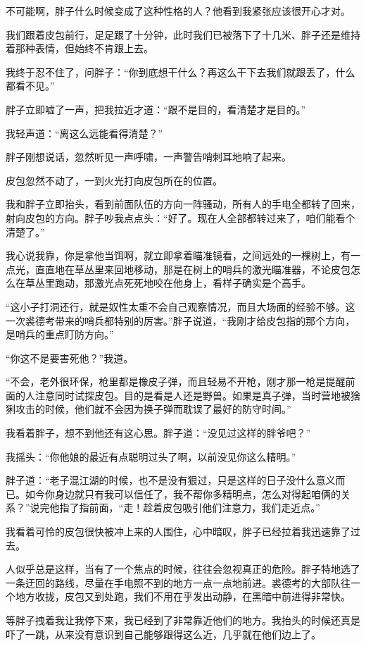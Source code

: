 不可能啊，胖子什么时候变成了这种性格的人？他看到我紧张应该很开心才对。

我们跟着皮包前行，足足跟了十分钟，此时我们已被落下了十几米、胖子还是维持着那种表情，但始终不肯跟上去。

我终于忍不住了，问胖子：“你到底想干什么？再这么干下去我们就跟丢了，什么都看不见。”

胖子立即嘘了一声，把我拉近才道：“跟不是目的，看清楚才是目的。”

我轻声道：“离这么远能看得清楚？”

胖子刚想说话，忽然听见一声呼啸，一声警告哨刺耳地响了起来。

皮包忽然不动了，一到火光打向皮包所在的位置。

我和胖子立即抬头，看到前面队伍的方向一阵骚动，所有人的手电全都转了回来，射向皮包的方向。胖子吵我点点头：“好了。现在人全部都转过来了，咱们能看个清楚了。”

我心说我靠，你是拿他当饵啊，就立即拿着瞄准镜看，之间远处的一棵树上，有一点光，直直地在草丛里来回地移动，那是在树上的哨兵的激光瞄准器，不论皮包怎么在草丛里跑动，那激光点死死地咬在他身上，看样子确实是个高手。

“这小子打洞还行，就是奴性太重不会自己观察情况，而且大场面的经验不够。这一次裘德考带来的哨兵都特别的厉害。”胖子说道，“我刚才给皮包指的那个方向，是哨兵的重点盯防方向。”

“你这不是要害死他？”我道。

“不会，老外很环保，枪里都是橡皮子弹，而且轻易不开枪，刚才那一枪是提醒前面的人注意同时试探皮包。目的是看是人还是野兽。如果是真子弹，当时营地被猞猁攻击的时候，他们就不会因为换子弹而耽误了最好的防守时间。”

我看着胖子，想不到他还有这心思。胖子道：“没见过这样的胖爷吧？”

我摇头：“你他娘的最近有点聪明过头了啊，以前没见你这么精明。”

胖子道：“老子混江湖的时候，也不是没有狠过，只是这样的日子没什么意义而已。如今你身边就只有我可以信任了，我不帮你多精明点，怎么对得起咱俩的关系？”说完他指了指前面，“走！趁着皮包吸引他们注意力，我们走近点。”

我看着可怜的皮包很快被冲上来的人围住，心中暗叹，胖子已经拉着我迅速靠了过去。

人似乎总是这样，当有了一个焦点的时候，往往会忽视真正的危险。胖子特地选了一条迂回的路线，尽量在手电照不到的地方一点一点地前进。裘德考的大部队往一个地方收拢，皮包又到处跑，我们不用在乎发出动静，在黑暗中前进得非常快。

等胖子拽着我让我停下来，我已经到了非常靠近他们的地方。我抬头的时候还真是吓了一跳，从来没有意识到自己能够跟得这么近，几乎就在他们边上了。

